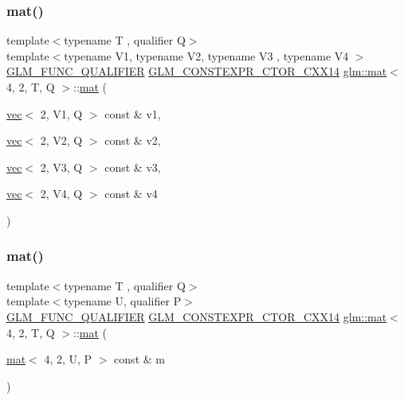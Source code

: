 \subsubsection{\texorpdfstring{mat()}{mat()}\hspace{0.1cm}{\footnotesize\ttfamily [20/21]}}
{\footnotesize\ttfamily template$<$typename T , qualifier Q$>$ \\
template$<$typename V1, typename V2, typename V3 , typename V4 $>$ \\
\mbox{\hyperlink{setup_8hpp_a33fdea6f91c5f834105f7415e2a64407}{G\+L\+M\+\_\+\+F\+U\+N\+C\+\_\+\+Q\+U\+A\+L\+I\+F\+I\+ER}} \mbox{\hyperlink{setup_8hpp_a0900f9145e68bf6061b6f5e7be3fa751}{G\+L\+M\+\_\+\+C\+O\+N\+S\+T\+E\+X\+P\+R\+\_\+\+C\+T\+O\+R\+\_\+\+C\+X\+X14}} \mbox{\hyperlink{structglm_1_1mat}{glm\+::mat}}$<$ 4, 2, T, Q $>$\+::\mbox{\hyperlink{structglm_1_1mat}{mat}} (\begin{DoxyParamCaption}\item[{\mbox{\hyperlink{structglm_1_1vec}{vec}}$<$ 2, V1, Q $>$ const \&}]{v1,  }\item[{\mbox{\hyperlink{structglm_1_1vec}{vec}}$<$ 2, V2, Q $>$ const \&}]{v2,  }\item[{\mbox{\hyperlink{structglm_1_1vec}{vec}}$<$ 2, V3, Q $>$ const \&}]{v3,  }\item[{\mbox{\hyperlink{structglm_1_1vec}{vec}}$<$ 2, V4, Q $>$ const \&}]{v4 }\end{DoxyParamCaption})}

\mbox{\label{structglm_1_1mat_3_014_00_012_00_01_t_00_01_q_01_4_aee1461cf7e6bb89dcc9e2d387faef90b}} 
\subsubsection{\texorpdfstring{mat()}{mat()}\hspace{0.1cm}{\footnotesize\ttfamily [21/21]}}
{\footnotesize\ttfamily template$<$typename T , qualifier Q$>$ \\
template$<$typename U, qualifier P$>$ \\
\mbox{\hyperlink{setup_8hpp_a33fdea6f91c5f834105f7415e2a64407}{G\+L\+M\+\_\+\+F\+U\+N\+C\+\_\+\+Q\+U\+A\+L\+I\+F\+I\+ER}} \mbox{\hyperlink{setup_8hpp_a0900f9145e68bf6061b6f5e7be3fa751}{G\+L\+M\+\_\+\+C\+O\+N\+S\+T\+E\+X\+P\+R\+\_\+\+C\+T\+O\+R\+\_\+\+C\+X\+X14}} \mbox{\hyperlink{structglm_1_1mat}{glm\+::mat}}$<$ 4, 2, T, Q $>$\+::\mbox{\hyperlink{structglm_1_1mat}{mat}} (\begin{DoxyParamCaption}\item[{\mbox{\hyperlink{structglm_1_1mat}{mat}}$<$ 4, 2, U, P $>$ const \&}]{m }\end{DoxyParamCaption})}



